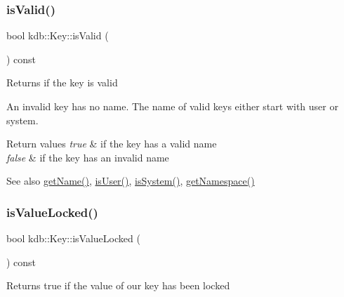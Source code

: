 \subsubsection{\texorpdfstring{isValid()}{isValid()}}
{\footnotesize\ttfamily bool kdb\+::\+Key\+::is\+Valid (\begin{DoxyParamCaption}{ }\end{DoxyParamCaption}) const\hspace{0.3cm}{\ttfamily [inline]}}

\begin{DoxyReturn}{Returns}
if the key is valid
\end{DoxyReturn}
An invalid key has no name. The name of valid keys either start with user or system.


\begin{DoxyRetVals}{Return values}
{\em true} & if the key has a valid name \\
\hline
{\em false} & if the key has an invalid name\\
\hline
\end{DoxyRetVals}
\begin{DoxySeeAlso}{See also}
\mbox{\hyperlink{classkdb_1_1Key_a6c1812730e9cb714893c9f9b1e503303}{get\+Name()}}, \mbox{\hyperlink{classkdb_1_1Key_a3b3d0d74246b259b10caed425216d91c}{is\+User()}}, \mbox{\hyperlink{classkdb_1_1Key_a44833fb97b02ca58205c48d740c4cada}{is\+System()}}, \mbox{\hyperlink{classkdb_1_1Key_a71b191c56eacb692c2f92ed440b32b46}{get\+Namespace()}} 
\end{DoxySeeAlso}
\mbox{\label{classkdb_1_1Key_a92daf058cb9896c7a926bddeecf179ef}} 
\subsubsection{\texorpdfstring{isValueLocked()}{isValueLocked()}}
{\footnotesize\ttfamily bool kdb\+::\+Key\+::is\+Value\+Locked (\begin{DoxyParamCaption}{ }\end{DoxyParamCaption}) const\hspace{0.3cm}{\ttfamily [inline]}}

\begin{DoxyReturn}{Returns}
true if the value of our key has been locked 
\end{DoxyReturn}
\mbox{\label{classkdb_1_1Key_add635e6194c7a05b7d4e470f7b135d9c}} 
